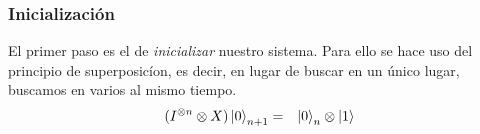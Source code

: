 \begin{frame}
\frametitle{Inicialización}
El primer paso es el de \textit{inicializar} nuestro sistema. Para ello se hace uso del principio de superposicíon, es decir, en lugar de buscar en un único lugar, buscamos en varios al mismo tiempo.
\pause
\begin{eqnarray}
(I^{\otimes n}\otimes X)\ket{0}_{n+1}&=&\ket{0}_n\otimes\ket{1}
\end{eqnarray}
\end{frame}

%
%
%
%
